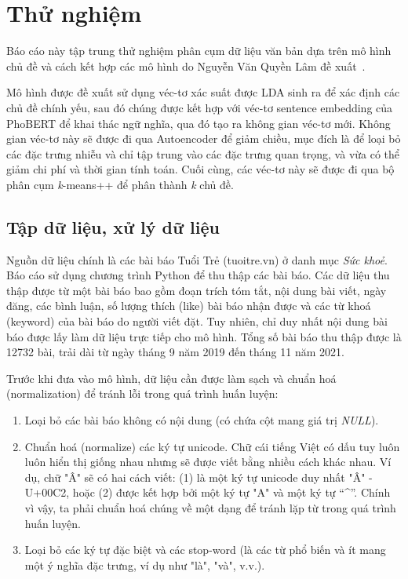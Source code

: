 \section{Thử nghiệm}
\label{sec:experiments}

Báo cáo này tập trung thử nghiệm phân cụm dữ liệu văn bản dựa trên mô hình chủ
đề và cách kết hợp các mô hình do Nguyễn Văn Quyền Lâm đề
xuất~\cite{lamGomCumVan2021}.

Mô hình được đề xuất sử dụng véc-tơ xác suất được LDA sinh ra để xác định các
chủ đề chính yếu, sau đó chúng được kết hợp với véc-tơ sentence embedding của
PhoBERT để khai thác ngữ nghĩa, qua đó tạo ra không gian véc-tơ mới. Không gian
véc-tơ này sẽ được đi qua Autoencoder để giảm chiều, mục đích là để loại bỏ các
đặc trưng nhiễu và chỉ tập trung vào các đặc trưng quan trọng, và vừa có thể
giảm chi phí và thời gian tính toán. Cuối cùng, các véc-tơ này sẽ được đi qua
bộ phân cụm \textit{k}-means++ để phân thành \textit{k} chủ đề.


\subsection{Tập dữ liệu, xử lý dữ liệu}

Nguồn dữ liệu chính là các bài báo Tuổi Trẻ (tuoitre.vn) ở danh mục \textit{Sức
khoẻ}. Báo cáo sử dụng chương trình Python để thu thập các bài báo. Các dữ liệu
thu thập được từ một bài báo bao gồm đoạn trích tóm tắt, nội dung bài viết,
ngày đăng, các bình luận, số lượng thích (like) bài báo nhận được và các từ
khoá (keyword) của bài báo do người viết đặt. Tuy nhiên, chỉ duy nhất nội dung
bài báo được lấy làm dữ liệu trực tiếp cho mô hình. Tổng số bài báo thu thập
được là 12732 bài, trải dài từ ngày tháng 9 năm 2019 đến tháng 11 năm 2021.

Trước khi đưa vào mô hình, dữ liệu cần được làm sạch và chuẩn hoá
(normalization) để tránh lỗi trong quá trình huấn luyện:
\begin{enumerate}
    \item Loại bỏ các bài báo không có nội dung (có chứa cột mang giá trị
        \textit{NULL}).
    \item Chuẩn hoá (normalize) các ký tự unicode. Chữ cái tiếng Việt có dấu
        tuy luôn luôn hiển thị giống nhau nhưng sẽ được viết bằng nhiều cách
        khác nhau. Ví dụ, chữ "Â" sẽ có hai cách viết: (1) là một ký tự unicode
        duy nhất "Â" - U+00C2, hoặc (2) được kết hợp bởi một ký tự "A" và một
        ký tự ``\^{}''. Chính vì vậy, ta phải chuẩn hoá chúng về một dạng để tránh
        lặp từ trong quá trình huấn luyện.
    \item Loại bỏ các ký tự đặc biệt và các stop-word (là các từ phổ biến và ít
        mang một ý nghĩa đặc trưng, ví dụ như "là", "và", v.v.).
\end{enumerate}

